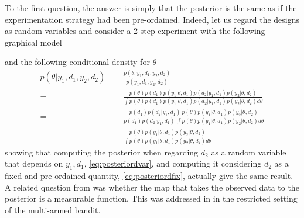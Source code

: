 To the first question, the answer is simply that the posterior is the same as if the experimentation strategy had been pre-ordained. Indeed, let us regard the designs as random variables and consider a 2-step experiment with the following graphical model
\begin{center}
\end{center}
and the following conditional density for $\theta$
\begin{align}
	p(\theta | y_1, d_1, y_2, d_2) =& \frac{p(\theta, y_1, d_1, y_2, d_2)}{p(y_1, d_1, y_2, d_2)} \\
	\label{eq:posteriordvar}
	=& \frac{p(\theta)p(d_1)p(y_1|\theta, d_1)p(d_2|y_1,d_1)p(y_2|\theta,d_2)}{\int p(\theta)p(d_1)p(y_1|\theta, d_1)p(d_2|y_1,d_1)p(y_2|\theta,d_2) d\theta} \\
	=& \frac{p(d_1)p(d_2|y_1,d_1)\ p(\theta)p(y_1|\theta, d_1)p(y_2|\theta,d_2)}{p(d_1)p(d_2|y_1,d_1)\ \int p(\theta)p(y_1|\theta, d_1)p(y_2|\theta,d_2) d\theta} \\
	\label{eq:posteriordfix}
	=& \frac{p(\theta)p(y_1|\theta, d_1)p(y_2|\theta,d_2)}{\int p(\theta)p(y_1|\theta, d_1)p(y_2|\theta,d_2) d\theta}
\end{align}
showing that computing the posterior when regarding $d_2$ as a random variable that depends on $y_1, d_1$, \eqref{eq:posteriordvar}, and computing it considering $d_2$ as a fixed and pre-ordained quantity, \eqref{eq:posteriordfix}, actually give the same result. A related question from \cite{berry1985} was whether the map that takes the observed data to the posterior is a measurable function. This was addressed in \cite[pp. 18-20]{berry1985} in the restricted setting of the multi-armed bandit.

